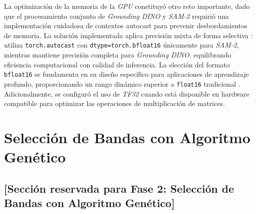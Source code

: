 La optimización de la memoria de la \emph{GPU} constituyó otro reto importante, dado que el procesamiento conjunto de \emph{Grounding DINO} y \emph{SAM-2} requirió una implementación cuidadosa de contextos autocast para prevenir desbordamientos de memoria. La solución implementada aplica precisión mixta de forma selectiva \cite{micikevicius2018mixedprecisiontraining}: utiliza \texttt{torch.autocast} con \texttt{dtype=torch.bfloat16} únicamente para \emph{SAM-2}, mientras mantiene precisión completa para \emph{Grounding DINO}, equilibrando eficiencia computacional con calidad de inferencia. La elección del formato \texttt{bfloat16} se fundamenta en su diseño específico para aplicaciones de aprendizaje profundo, proporcionando un rango dinámico superior a \texttt{float16} tradicional \cite{8877411}. Adicionalmente, se configuró el uso de \emph{TF32} cuando está disponible en hardware compatible para optimizar las operaciones de multiplicación de matrices.

\section{Selección de Bandas con Algoritmo Genético}

\subsection{[Sección reservada para Fase 2: Selección de Bandas con Algoritmo Genético]}
